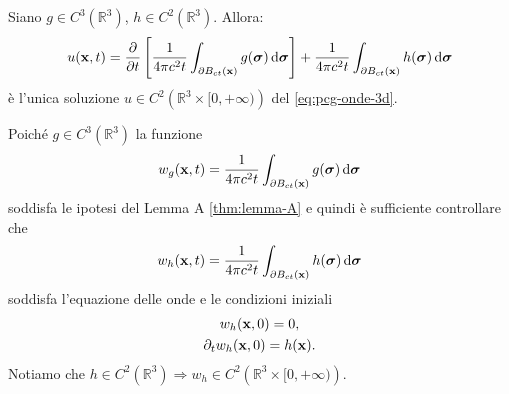 \begin{theorem}
     Siano $\displaystyle g\in C^{3}\left(\mathbb{R}^{3}\right)$, $\displaystyle h\in C^{2}\left(\mathbb{R}^{3}\right)$. Allora:
    \begin{equation}
        u(\mathbf{x} ,t) =\frac{\partial }{\partial t}\left[\frac{1}{4\pi c^{2} t}\int _{\partial B_{ct}(\mathbf{x})} g(\bm{\sigma}) \,\mathrm d \bm{\sigma}\right] +\frac{1}{4\pi c^{2} t}\int _{\partial B_{ct}(\mathbf{x})} h(\bm{\sigma}) \,\mathrm d \bm{\sigma}
    \end{equation}
    è l'unica soluzione $\displaystyle u\in C^{2}\left(\mathbb{R}^{3} \times [ 0,+\infty)\right)$ del \eqref{eq:pcg-onde-3d}.
\end{theorem}
\begin{dimostrazione}
    Poiché $\displaystyle g\in C^{3}\left(\mathbb{R}^{3}\right)$ la funzione
    \begin{equation*}
        w_{g}(\mathbf{x} ,t) =\frac{1}{4\pi c^{2} t}\int _{\partial B_{ct}(\mathbf{x})} g(\bm{\sigma}) \,\mathrm d \bm{\sigma}
    \end{equation*}
    soddisfa le ipotesi del Lemma A \ref{thm:lemma-A} e quindi è sufficiente controllare che
    \begin{equation*}
        w_{h}(\mathbf{x} ,t) =\frac{1}{4\pi c^{2} t}\int _{\partial B_{ct}(\mathbf{x})} h(\bm{\sigma}) \,\mathrm d \bm{\sigma}
    \end{equation*}
    soddisfa l'equazione delle onde e le condizioni iniziali
    \begin{gather*}
        w_{h}(\mathbf{x} ,0) =0,\\
        \partial _{t} w_{h}(\mathbf{x} ,0) =h(\mathbf{x}) .
    \end{gather*}
    Notiamo che $\displaystyle h\in C^{2}\left(\mathbb{R}^{3}\right) \Rightarrow w_{h} \in C^{2}\left(\mathbb{R}^{3} \times [ 0,+\infty)\right)$.


\end{dimostrazione}
